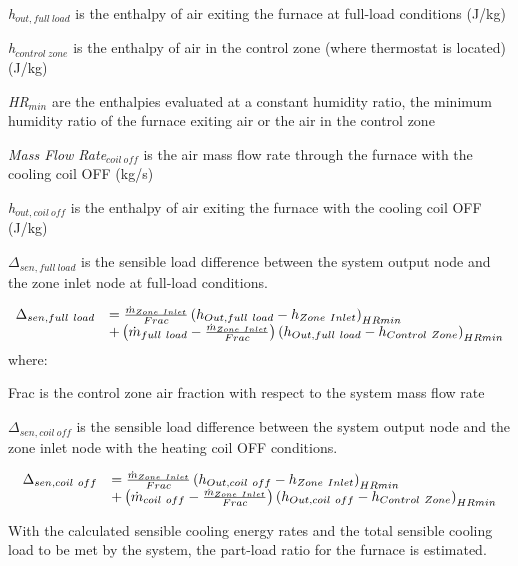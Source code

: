 \emph{h\(_{out,full~load}\)} is the enthalpy of air exiting the furnace at full-load conditions (J/kg)

\emph{h\(_{control~zone}\)} is the enthalpy of air in the control zone (where thermostat is located) (J/kg)

\emph{HR\(_{min}\)} are the enthalpies evaluated at a constant humidity ratio, the minimum humidity ratio of the furnace exiting air or the air in the control zone

\emph{Mass Flow Rate\(_{coil~off}\)} is the air mass flow rate through the furnace with the cooling coil OFF (kg/s)

\emph{h\(_{out,coil~off}\)} is the enthalpy of air exiting the furnace with the cooling coil OFF (J/kg)

\(\Delta_{sen,full~load}\) is the sensible load difference between the system output node and the zone inlet node at full-load conditions.

\begin{equation}
  \begin{array}{rl}
    \Delta_{sen,full~load} &= \frac{\dot{m}_{Zone~Inlet}}{Frac} \left(h_{Out,full~load} - h_{Zone~Inlet}\right)_{HRmin} \\
                           &+ \left(\dot{m}_{full~load} - \frac{\dot{m}_{Zone~Inlet}}{Frac}\right) \left(h_{Out,full~load} - h_{Control~Zone}\right)_{HRmin}
  \end{array}
\end{equation}
where:

Frac is the control zone air fraction with respect to the system mass flow rate

\(\Delta_{sen,coil~off}\) is the sensible load difference between the system output node and the zone inlet node with the heating coil OFF conditions.

\begin{equation}
  \begin{array}{rl}
    \Delta_{sen,coil~off} &= \frac{\dot{m}_{Zone~Inlet}}{Frac} \left(h_{Out,coil~off} - h_{Zone~Inlet}\right)_{HRmin} \\
                           &+ \left(\dot{m}_{coil~off} - \frac{\dot{m}_{Zone~Inlet}}{Frac}\right) \left(h_{Out,coil~off} - h_{Control~Zone}\right)_{HRmin}
  \end{array}
\end{equation}

With the calculated sensible cooling energy rates and the total sensible cooling load to be met by the system, the part-load ratio for the furnace is estimated.

